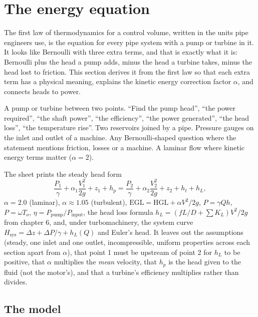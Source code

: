 \section{The energy equation}
\label{sec:energy}

The first law of thermodynamics for a control volume, written in the units pipe engineers use, is the equation for every pipe system with a pump or turbine in it. It looks like Bernoulli with three extra terms, and that is exactly what it is: Bernoulli plus the head a pump adds, minus the head a turbine takes, minus the head lost to friction. This section derives it from the first law so that each extra term has a physical meaning, explains the kinetic energy correction factor $\alpha$, and connects heads to power.

\begin{recognise}
A pump or turbine between two points. ``Find the pump head'', ``the power required'', ``the shaft power'', ``the efficiency'', ``the power generated'', ``the head loss'', ``the temperature rise''. Two reservoirs joined by a pipe. Pressure gauges on the inlet and outlet of a machine. Any Bernoulli-shaped question where the statement mentions friction, losses or a machine. A laminar flow where kinetic energy terms matter ($\alpha = 2$).
\end{recognise}

\begin{onsheet}
The sheet prints the steady head form
\[
\frac{P_1}{\gamma} + \alpha_1\frac{V_1^2}{2g} + z_1 + h_p = \frac{P_2}{\gamma} + \alpha_2\frac{V_2^2}{2g} + z_2 + h_t + h_L ,
\]
$\alpha = 2.0$ (laminar), $\alpha\approx1.05$ (turbulent), $\mathrm{EGL} = \mathrm{HGL} + \alpha V^2/2g$, $P = \gamma Qh$, $P = \omega T_o$, $\eta = P_\text{pump}/P_\text{input}$, the head loss formula $h_L = (fL/D + \sum K_L)V^2/2g$ from chapter 6, and, under turbomachinery, the system curve $H_\text{sys} = \Delta z + \Delta P/\gamma + h_L(Q)$ and Euler's head. It leaves out the assumptions (steady, one inlet and one outlet, incompressible, uniform properties across each section apart from $\alpha$), that point 1 must be upstream of point 2 for $h_L$ to be positive, that $\alpha$ multiplies the \emph{mean} velocity, that $h_p$ is the head given to the fluid (not the motor's), and that a turbine's efficiency multiplies rather than divides.
\end{onsheet}

\subsection*{The model}

